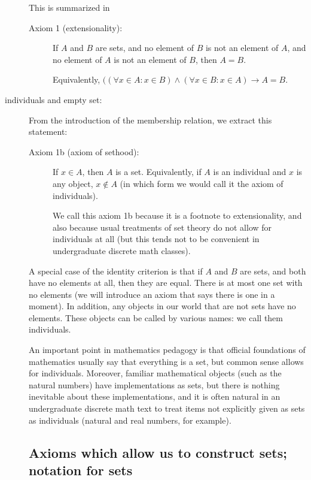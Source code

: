 \documentclass[12pt]{article}
\begin{document}
\begin{description}
This is summarized in

\begin{description}

\item[Axiom 1 (extensionality):]  If $A$ and $B$ are sets, and no element of $B$ is not an element of $A$, and no element of $A$ is not an element of $B$, then $A=B$.

Equivalently, $((\forall x \in A: x\in B) \wedge (\forall x \in B:x \in A) \rightarrow A=B$.

\end{description}

\item[individuals and empty set:]   From the introduction of the membership relation, we extract this statement:  

\begin{description}
\item[Axiom 1b (axiom of sethood):]  If $x \in A$, then $A$ is a set.  Equivalently, if $A$ is an individual and $x$ is any object, $x \not\in A$ (in which form we would call it the axiom of individuals).

We call this axiom 1b because it is a footnote to extensionality, and also because usual treatments of set theory do not allow for individuals at all (but this tends not to be convenient in undergraduate discrete math classes).
\end{description}

A special case of the identity criterion is that if $A$ and $B$ are sets, and both have no elements at all, then they are equal.   There is at most one set with no elements (we will introduce an axiom that says there is one in a moment).  In addition, any objects in our world that are not sets have no elements.  These objects can be called by various names:  we call them individuals.

An important point in mathematics pedagogy is that official foundations of mathematics usually say that everything is a set,  but common sense allows for individuals.  Moreover, familiar mathematical objects (such as the natural numbers) have implementations as sets, but there is nothing inevitable about these implementations, and it is often natural in an undergraduate discrete math text to treat items not explicitly given as sets as individuals (natural and real numbers, for example).

\newpage

\subsection{Axioms which allow us to construct sets;  notation for sets}


\end{description}
\end{document}
